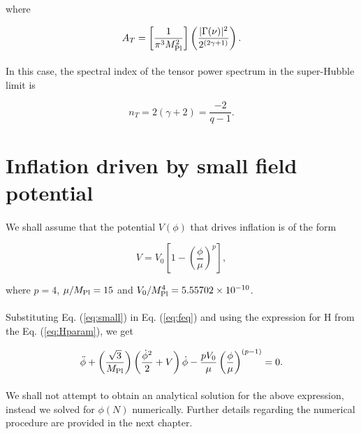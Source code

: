 \documentclass[12pt,a4paper,oneside]{book}
\begin{document}
\noindent where

\begin{equation}
A_T = \left[\frac{1}{\pi^3M_{\rm Pl}^2}\right]\left(\frac{|\Gamma(\nu)|^2}{2^{(2\gamma+1)}}\right).
\end{equation}

\paragraph*{} In this case, the spectral index of the tensor power spectrum in the super-Hubble limit is 

\begin{equation}
n_T = 2(\gamma+2) = \frac{-2}{q-1}.
\end{equation}

\section{Inflation driven by small field potential}

\paragraph*{} We shall assume that the potential $V(\phi)$ that drives inflation is of the form 

\begin{equation}\label{eq:small}
V = V_0\left[1 - \left(\frac{\phi}{\mu}\right)^p\right],
\end{equation}

\noindent where $p = 4$, $\mu/M_{\rm Pl}= 15$ and $V_0/M_{\rm Pl}^4 = 5.55702\times10^{-10}$.

\paragraph*{} Substituting Eq. (\ref{eq:small}) in Eq. (\ref{eq:feq}) and using the expression for H from the Eq. (\ref{eq:Hparam}), we get

\begin{equation}
\ddot{\phi} + \left(\frac{\sqrt{3}}{M_{\rm Pl}}\right)\left(\frac{\dot{\phi}^2}{2} + V\right)\dot{\phi} - \frac{pV_0}{\mu}\left(\frac{\phi}{\mu}\right)^{(p-1)} = 0.
\end{equation}

\paragraph*{} We shall not attempt to obtain an analytical solution for the above expression, instead we solved for $\phi(N)$ numerically. 
Further details regarding the numerical procedure are provided in the next chapter.
\end{document}
